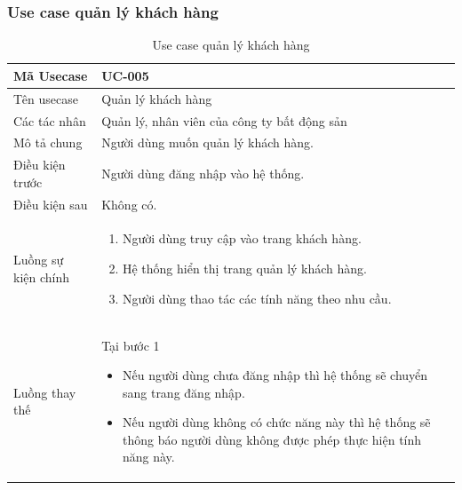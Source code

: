 \documentclass[12pt,a4paper]{article}
\begin{document}
    \subsubsection*{Use case quản lý khách hàng}
    \begin{table}[H]
        \centering
        \begin{tabular}{|p{3.5cm}|p{11.5cm}|c|}
            \hline
            Mã Usecase      & UC-005                                      \\
            \hline
            Tên usecase     & Quản lý khách hàng                          \\
            \hline
            Các tác nhân    & Quản lý, nhân viên của công ty bất động sản \\
            \hline
            Mô tả chung     & Người dùng muốn quản lý khách hàng.         \\
            \hline

            Điều kiện trước & Người dùng đăng nhập vào hệ thống.          \\
            \hline

            Điều kiện sau   & Không có.                                   \\
            \hline

            Luồng sự kiện chính & \vspace{-.8cm}\begin{enumerate}
                                                    \item Người dùng truy cập vào trang khách hàng.
                                                    \item Hệ thống hiển thị trang quản lý khách hàng.
                                                    \item Người dùng thao tác các tính năng theo nhu cầu.
            \end{enumerate}
            \\
            \hline
            Luồng thay thế & Tại bước 1\newline
            \vspace{-.8cm}\begin{itemize}
                              \item Nếu người dùng chưa đăng nhập thì hệ thống sẽ chuyển sang trang đăng nhập.
                              \item Nếu người dùng không có chức năng này thì hệ thống sẽ thông báo người dùng không được phép thực hiện tính năng này.
            \end{itemize}

            \\ \hline
        \end{tabular}
        \caption{Use case quản lý khách hàng}
    \end{table}
\end{document}
